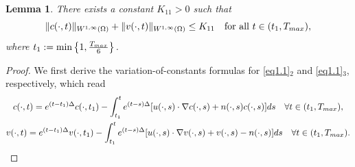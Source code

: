\documentclass[10pt,a4paper]{amsart}
\numberwithin{equation}{section}
\newtheorem{lemma}[theo]{Lemma}
\begin{document}
\begin{lemma}\label{lem3.10}
There exists a constant $K_{11}> 0$ such that
\begin{equation}\label{(3.70)}
\| c(\cdot, t) \|_{W^{1,\infty}(\Omega)} + \| v(\cdot, t) \|_{W^{1,\infty}(\Omega)}
  \leq K_{11} \quad \text{for all } t \in (t_1, T_{\rm max}),
\end{equation}
where $t_1:=\min\left\{1,\frac{T_{\rm max}}{6}\right\}$.
\end{lemma}

\begin{proof} 
We first derive the variation-of-constants formulas for \eqref{eq1.1}$_2$ and 
\eqref{eq1.1}$_3$, respectively, which read
\begin{gather}\label{9.13-12}
c(\cdot, t) = e^{(t-t_1)\Delta} c(\cdot, t_1)- \int_{t_1}^t
 e^{(t - s)\Delta} [ u(\cdot, s) \cdot \nabla c(\cdot, s) + n(\cdot, s)c(\cdot, s) ] ds 
 \quad \forall t \in (t_1, T_{\rm max}), \\
\label{9.13-22}
v(\cdot, t) = e^{(t-t_1)\Delta} v(\cdot, t_1) - \int_{t_1}^t e^{(t - s)\Delta} 
[ u(\cdot, s) \cdot \nabla v(\cdot, s) + v(\cdot, s) - n(\cdot, s) ] ds \quad 
\forall  t \in (t_1, T_{\rm max}).
\end{gather}


\end{proof}
\end{document}
